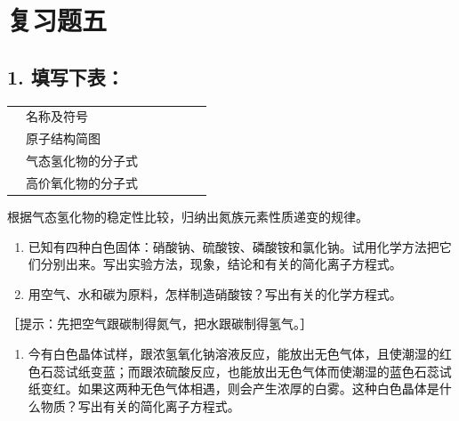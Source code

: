 \section{复习题五}

\subsection{1. 填写下表：}

{\def\LTcaptype{none} %
\begin{longtable}[]{@{}
  >{\raggedright\arraybackslash}p{}
  >{\raggedright\arraybackslash}p{}
  >{\raggedright\arraybackslash}p{}
  >{\raggedright\arraybackslash}p{}
  >{\raggedright\arraybackslash}p{}
  >{\raggedright\arraybackslash}p{}
  >{\raggedright\arraybackslash}p{}@{}}
\toprule\noalign{}
\endhead
\bottomrule\noalign{}
\endlastfoot
\multirow{4}{*}{氮族元素} & 名称及符号 & & & & & \\
& 原子结构简图 & & & & & \\
& 气态氢化物的分子式 & & & & & \\
& 高价氧化物的分子式 & & & & & \\
\end{longtable}
}

根据气态氢化物的稳定性比较，归纳出氮族元素性质递变的规律。

\begin{enumerate}[start=2]
\item
  已知有四种白色固体：硝酸钠、硫酸铵、磷酸铵和氯化钠。试用化学方法把它们分别出来。写出实验方法，现象，结论和有关的简化离子方程式。
\item
  用空气、水和碳为原料，怎样制造硝酸铵？写出有关的化学方程式。
\end{enumerate}

［提示：先把空气跟碳制得氮气，把水跟碳制得氢气。］

\begin{enumerate}[start=4]
\item
  今有白色晶体试样，跟浓氢氧化钠溶液反应，能放出无色气体，且使潮湿的红色石蕊试纸变蓝；而跟浓硫酸反应，也能放出无色气体而使潮湿的蓝色石蕊试纸变红。如果这两种无色气体相遇，则会产生浓厚的白雾。这种白色晶体是什么物质？写出有关的简化离子方程式。
\end{enumerate}

